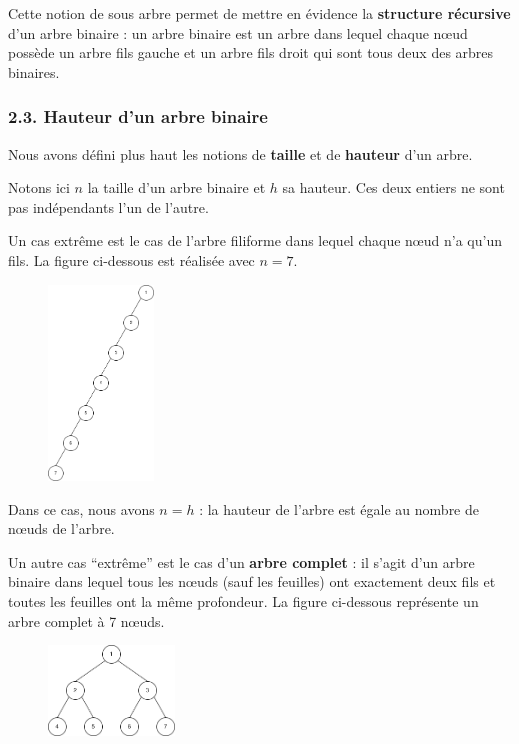\documentclass[
  a4paper,
  DIV=11,
  numbers=noendperiod]{scrartcl}
\begin{document}
Cette notion de sous arbre permet de mettre en évidence la
\textbf{structure récursive} d'un arbre binaire : un arbre binaire est
un arbre dans lequel chaque nœud possède un arbre fils gauche et un
arbre fils droit qui sont tous deux des arbres binaires.

\hypertarget{hauteur-dun-arbre-binaire}{%
\subsubsection{2.3. Hauteur d'un arbre
binaire}\label{hauteur-dun-arbre-binaire}}

Nous avons défini plus haut les notions de \textbf{taille} et de
\textbf{hauteur} d'un arbre.

Notons ici \(n\) la taille d'un arbre binaire et \(h\) sa hauteur. Ces
deux entiers ne sont pas indépendants l'un de l'autre.

Un cas extrême est le cas de l'arbre filiforme dans lequel chaque nœud
n'a qu'un fils. La figure ci-dessous est réalisée avec \(n=7\).

\begin{figure}

{\centering \includegraphics[width=0.25\textwidth,height=\textheight]{arbre_fili.png}

}

\end{figure}

Dans ce cas, nous avons \(n=h\) : la hauteur de l'arbre est égale au
nombre de nœuds de l'arbre.

Un autre cas ``extrême'' est le cas d'un \textbf{arbre complet} : il
s'agit d'un arbre binaire dans lequel tous les nœuds (sauf les feuilles)
ont exactement deux fils et toutes les feuilles ont la même profondeur.
La figure ci-dessous représente un arbre complet à 7 nœuds.

\begin{figure}

{\centering \includegraphics[width=0.3\textwidth,height=\textheight]{arbre_complet.png}

}

\end{figure}
\end{document}
